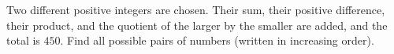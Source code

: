 Two different positive integers are chosen. Their sum, their positive difference, their product, and the quotient of the larger by the smaller are added, and the total is $450$. Find all possible pairs of numbers (written in increasing order).
